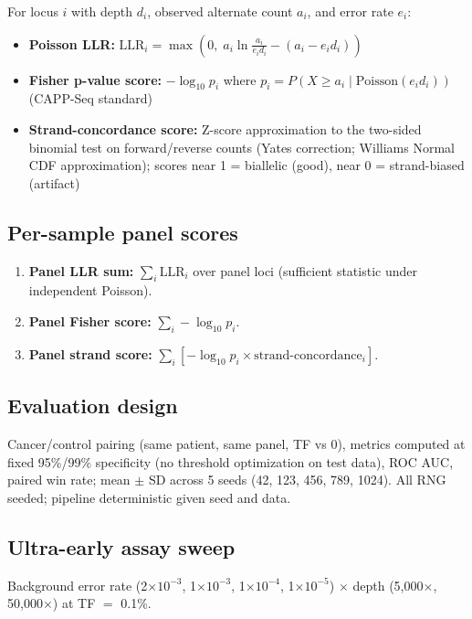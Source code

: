 \documentclass[11pt]{article}
\begin{document}
For locus $i$ with depth $d_i$, observed alternate count $a_i$, and error rate $e_i$:
\begin{itemize}
\item \textbf{Poisson LLR:} $\mathrm{LLR}_i = \max\left(0,\; a_i \ln\frac{a_i}{e_i d_i} - (a_i - e_i d_i)\right)$
\item \textbf{Fisher p-value score:} $-\log_{10} p_i$ where $p_i = P(X \ge a_i \mid \mathrm{Poisson}(e_i d_i))$ (CAPP-Seq standard)
\item \textbf{Strand-concordance score:} Z-score approximation to the two-sided binomial test on forward/reverse counts (Yates correction; Williams Normal CDF approximation); scores near 1 = biallelic (good), near 0 = strand-biased (artifact)
\end{itemize}

\subsection{Per-sample panel scores}

\begin{enumerate}
\item \textbf{Panel LLR sum:} $\sum_i \mathrm{LLR}_i$ over panel loci (sufficient statistic under independent Poisson).
\item \textbf{Panel Fisher score:} $\sum_i -\log_{10} p_i$.
\item \textbf{Panel strand score:} $\sum_i [-\log_{10} p_i \times \text{strand-concordance}_i]$.
\end{enumerate}

\subsection{Evaluation design}

Cancer/control pairing (same patient, same panel, TF vs 0), metrics computed at fixed 95\%/99\% specificity (no threshold optimization on test data), ROC AUC, paired win rate; mean $\pm$ SD across 5 seeds (42, 123, 456, 789, 1024). All RNG seeded; pipeline deterministic given seed and data.

\subsection{Ultra-early assay sweep}

Background error rate (2$\times10^{-3}$, 1$\times10^{-3}$, 1$\times10^{-4}$, 1$\times10^{-5}$) $\times$ depth (5,000$\times$, 50,000$\times$) at TF $=$ 0.1\%.
\end{document}
